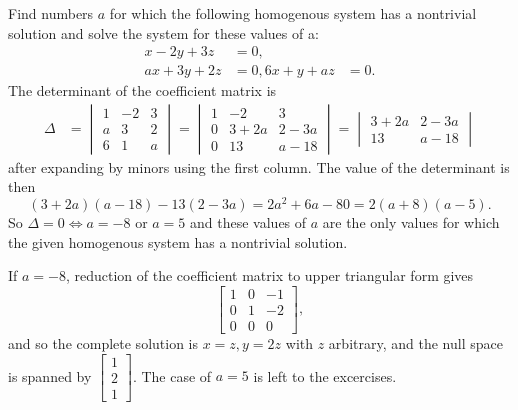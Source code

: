 \documentclass[../main.tex]{subfiles}
\begin{document}
\begin{example} \label{ex:4_15}
  Find numbers \(a\) for which the following homogenous system has a nontrivial solution and solve the system for these values of a:
  \begin{equation*}
    \begin{aligned}
      x - 2y + 3z &= 0,\\
      ax + 3y + 2z &= 0,
      6x + y + az &= 0.
    \end{aligned}
  \end{equation*}
  The determinant of the coefficient matrix is
  \begin{equation*}
    \begin{aligned}
      \Delta &= \begin{vmatrix}
        1 & -2 & 3\\
        a & 3 & 2\\
        6 & 1 & a
      \end{vmatrix}
      =\begin{vmatrix}
        1 & -2 & 3\\
        0 & 3+2a & 2-3a\\
        0 & 13 & a-18
      \end{vmatrix}
      =\begin{vmatrix}
        3+2a & 2-3a\\
        13 & a-18
      \end{vmatrix} 
    \end{aligned}
  \end{equation*}
  after expanding by minors using the first column. The value of the determinant is then
  \begin{equation*}
    (3+2a)(a-18)-13(2-3a)=2a^2+6a-80=2(a+8)(a-5).
  \end{equation*}
  So \(\Delta = 0 \Leftrightarrow a=-8 \text{ or } a=5\) and these values of \(a\) are the only values for which the given homogenous system has a nontrivial solution.
  
  If \(a=-8\), reduction of the coefficient matrix to upper triangular form gives
  \begin{equation*}
    \begin{bmatrix}
      1 & 0 & -1\\
      0 & 1 & -2\\
      0 & 0 & 0
    \end{bmatrix},
  \end{equation*}
  and so the complete solution is \(x = z, y=2z\) with \(z\) arbitrary, and the null space is spanned by \(\begin{bmatrix}
    1 \\ 2 \\ 1
  \end{bmatrix}\).
  The case of \(a=5\) is left to the excercises.
\end{example} 
\end{document}
